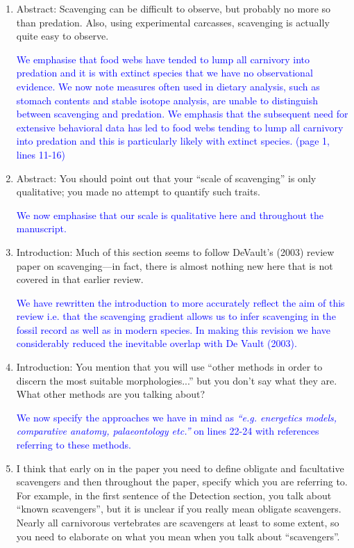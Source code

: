 \documentclass[12pt,letterpaper]{article}
\begin{document}
\begin{enumerate}
\item{Abstract: Scavenging can be difficult to observe, but probably no more so than predation.
Also, using experimental carcasses, scavenging is actually quite easy to observe.}

\textcolor{blue}{We emphasise that food webs have tended to lump all carnivory into predation and it is with extinct species that we have no observational evidence.
We now note measures often used in dietary analysis, such as stomach contents and stable isotope analysis, are unable to distinguish between scavenging and predation. We emphasis that the subsequent need for extensive behavioral data has led to food webs tending to lump all carnivory into predation and this is particularly likely with extinct species. (page 1, lines 11-16)}


\item{Abstract: You should point out that your ``scale of scavenging'' is only qualitative; you made no attempt to quantify such traits.}

\textcolor{blue}{We now emphasise that our scale is qualitative here and throughout the manuscript.}%

\item{Introduction: Much of this section seems to follow DeVault's (2003) review paper on scavenging—in fact, there is almost nothing new here that is not covered in that earlier review.}

\textcolor{blue}{We have rewritten the introduction to more accurately reflect the aim of this review i.e. that the scavenging gradient allows us to infer scavenging in the fossil record as well as in modern species. In making this revision we have considerably reduced the inevitable overlap with De Vault (2003).} %

\item{Introduction: You mention that you will use ``other methods in order to discern the most suitable morphologies...''  but you don't say what they are. What other methods are you talking about?}

\textcolor{blue}{We now specify the approaches we have in mind as \textit{``e.g. energetics models, comparative anatomy, palaeontology etc.''} on lines 22-24 with references referring to these methods.}




\item{I think that early on in the paper you need to define obligate and facultative scavengers and then throughout the paper, specify which you are referring to. For example, in the first sentence of the Detection section, you talk about ``known scavengers'', but it is unclear if you really mean obligate scavengers. Nearly all carnivorous vertebrates are scavengers at least to some extent, so you need to elaborate on what you mean when you talk about ``scavengers''.}


\end{enumerate}
\end{document}
